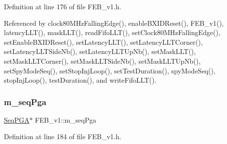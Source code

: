 Definition at line 176 of file F\+E\+B\+\_\+v1.\+h.



Referenced by clock80\+M\+Hz\+Falling\+Edge(), enable\+B\+X\+I\+D\+Reset(), F\+E\+B\+\_\+v1(), latency\+L\+L\+T(), mask\+L\+L\+T(), read\+Fifo\+L\+L\+T(), set\+Clock80\+M\+Hz\+Falling\+Edge(), set\+Enable\+B\+X\+I\+D\+Reset(), set\+Latency\+L\+L\+T(), set\+Latency\+L\+L\+T\+Corner(), set\+Latency\+L\+L\+T\+Side\+Nb(), set\+Latency\+L\+L\+T\+Up\+Nb(), set\+Mask\+L\+L\+T(), set\+Mask\+L\+L\+T\+Corner(), set\+Mask\+L\+L\+T\+Side\+Nb(), set\+Mask\+L\+L\+T\+Up\+Nb(), set\+Spy\+Mode\+Seq(), set\+Stop\+Inj\+Loop(), set\+Test\+Duration(), spy\+Mode\+Seq(), stop\+Inj\+Loop(), test\+Duration(), and write\+Fifo\+L\+L\+T().

\mbox{\label{classFEB__v1_a6c7804ac86796f233a8393043adf2e77}} 
\subsubsection{\texorpdfstring{m\+\_\+seq\+Pga}{m\_seqPga}}
{\footnotesize\ttfamily \hyperlink{classSeqPGA}{Seq\+P\+GA}$\ast$ F\+E\+B\+\_\+v1\+::m\+\_\+seq\+Pga\hspace{0.3cm}{\ttfamily [private]}}



Definition at line 184 of file F\+E\+B\+\_\+v1.\+h.



